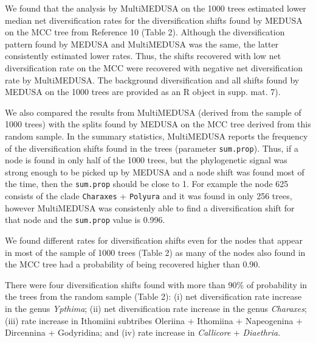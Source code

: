 \documentclass[]{article}
\begin{document}
We found that the analysis by MultiMEDUSA on the 1000 trees estimated
lower median net diversification rates for the diversification shifts
found by MEDUSA on the MCC tree from Reference 10 (Table 2). Although
the diversification pattern found by MEDUSA and MultiMEDUSA was the
same, the latter consistently estimated lower rates. Thus, the shifts
recovered with low net diversification rate on the MCC were recovered
with negative net diversification rate by MultiMEDUSA. The background
diversification and all shifts found by MEDUSA on the 1000 trees are
provided as an R object in supp. mat. 7).

We also compared the results from MultiMEDUSA (derived from the sample
of 1000 trees) with the splits found by MEDUSA on the MCC tree derived
from this random sample. In the summary statistics, MultiMEDUSA reports
the frequency of the diversification shifts found in the trees
(parameter \texttt{sum.prop}). Thus, if a node is found in only half of
the 1000 trees, but the phylogenetic signal was strong enough to be
picked up by MEDUSA and a node shift was found most of the time, then
the \texttt{sum.prop} should be close to 1. For example the node 625
consists of the clade \texttt{Charaxes} + \texttt{Polyura} and it was
found in only 256 trees, however MultiMEDUSA was consistenly able to
find a diversification shift for that node and the \texttt{sum.prop}
value is 0.996.

We found different rates for diversification shifts even for the nodes
that appear in most of the sample of 1000 trees (Table 2) as many of the
nodes also found in the MCC tree had a probability of being recovered
higher than 0.90.

There were four diversification shifts found with more than 90\% of
probability in the trees from the random sample (Table 2): (i) net
diversification rate increase in the genus \emph{Ypthima}; (ii) net
diversification rate increase in the genus \emph{Charaxes}; (iii) rate
increase in Ithomiini subtribes Oleriina + Ithomiina + Napeogenina +
Dircennina + Godyridina; and (iv) rate increase in \emph{Callicore} +
\emph{Diaethria}.
\end{document}
